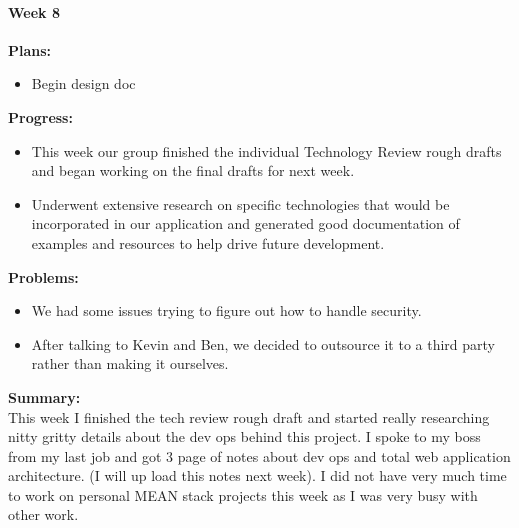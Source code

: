\paragraph{Week 8}
\begin{adjustwidth}{2.5em}{0pt}
    \vspace{-0.5cm}\textbf{Plans:}
    \vspace{-0.5cm}
    \begin{itemize}
        \item Begin design doc
    \end{itemize} 
    \vspace{-0.3cm}\textbf{Progress:}
    \vspace{-0.5cm}
    \begin{itemize}
        \item This week our group finished the individual Technology Review rough drafts and began working on the final drafts for next week. 
		\item Underwent extensive research on specific technologies that would be incorporated in our application and generated good documentation of examples and resources to help drive future development.  
    \end{itemize} 
	
	
	
	
    \vspace{-0.3cm}\textbf{Problems:}
    \vspace{-0.5cm}
    \begin{itemize}
        \item We had some issues trying to figure out how to handle security. 
		\item After talking to Kevin and Ben, we decided to outsource it to a third party rather than making it ourselves.
    \end{itemize}  
    \vspace{-0.3cm}\noindent\textbf{Summary:}\\
    \noindent This week I finished the tech review rough draft and started really researching nitty gritty details about the dev ops behind this project. I spoke to my boss from my last job and got 3 page of notes about dev ops and total web application architecture. (I will up load this notes next week). I did not have very much time to work on personal MEAN stack projects this week as I was very busy with other work.
\end{adjustwidth} 
